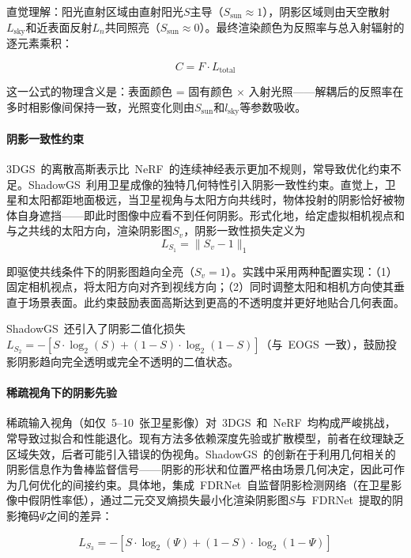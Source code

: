 直觉理解：阳光直射区域由直射阳光$S$主导（$S_{\text{sun}} \approx 1$），阴影区域则由天空散射$L_{\text{sky}}$和近表面反射$L_n$共同照亮（$S_{\text{sun}} \approx 0$）。最终渲染颜色为反照率与总入射辐射的逐元素乘积：

\begin{equation}
C = F \cdot L_{\text{total}}
\end{equation}

这一公式的物理含义是：表面颜色 = 固有颜色 $\times$ 入射光照——解耦后的反照率在多时相影像间保持一致，光照变化则由$S_{\text{sun}}$和$l_{\text{sky}}$等参数吸收。

\paragraph{阴影一致性约束} 3DGS~的离散高斯表示比~NeRF~的连续神经表示更加不规则，常导致优化约束不足。ShadowGS~利用卫星成像的独特几何特性引入阴影一致性约束。直觉上，卫星和太阳都距地面极远，当卫星视角与太阳方向共线时，物体投射的阴影恰好被物体自身遮挡——即此时图像中应看不到任何阴影。形式化地，给定虚拟相机视点和与之共线的太阳方向，渲染阴影图$S_v$，阴影一致性损失定义为
\begin{equation}
L_{S_1} = \| S_v - 1 \|_1
\end{equation}

即驱使共线条件下的阴影图趋向全亮（$S_v = 1$）。实践中采用两种配置实现：（1）固定相机视点，将太阳方向对齐到视线方向；（2）同时调整太阳和相机方向使其垂直于场景表面。此约束鼓励表面高斯达到更高的不透明度并更好地贴合几何表面。

ShadowGS~还引入了阴影二值化损失$L_{S_2} = -[S \cdot \log_2(S) + (1-S) \cdot \log_2(1-S)]$（与~EOGS~一致），鼓励投影阴影趋向完全透明或完全不透明的二值状态。

\paragraph{稀疏视角下的阴影先验} 稀疏输入视角（如仅~5--10~张卫星影像）对~3DGS~和~NeRF~均构成严峻挑战，常导致过拟合和性能退化。现有方法多依赖深度先验或扩散模型，前者在纹理缺乏区域失效，后者可能引入错误的伪视角。ShadowGS~的创新在于利用几何相关的阴影信息作为鲁棒监督信号——阴影的形状和位置严格由场景几何决定，因此可作为几何优化的间接约束。具体地，集成~FDRNet~自监督阴影检测网络（在卫星影像中假阴性率低），通过二元交叉熵损失最小化渲染阴影图$S$与~FDRNet~提取的阴影掩码$\Psi$之间的差异：

\begin{equation}
L_{S_3} = -[S \cdot \log_2(\Psi) + (1 - S) \cdot \log_2(1 - \Psi)]
\end{equation}

